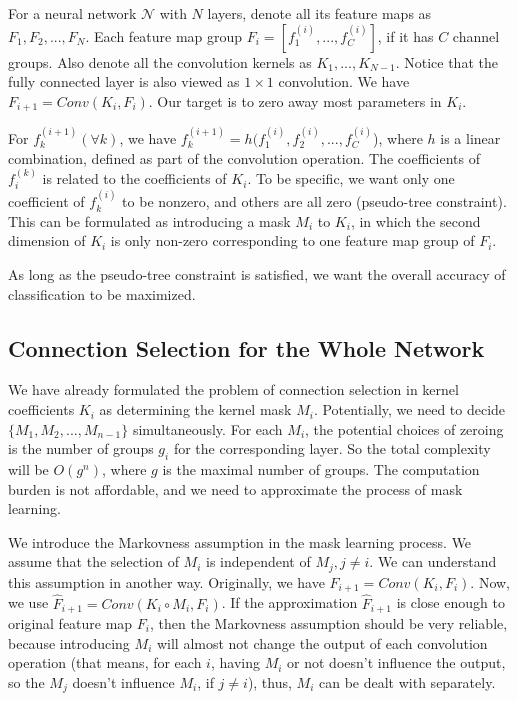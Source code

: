 \documentclass{acmtog} %
\begin{document}
For a neural network $\mathcal{N}$ with $N$ layers, denote all its feature maps as $F_1, F_2, ..., F_N$. Each feature map group $F_i = [f_1^{(i)}, ..., f_C^{(i)}]$, if it has $C$ channel groups. Also denote all the convolution kernels as $K_1, ..., K_{N-1}$. Notice that the fully connected layer is also viewed as $1\times1$ convolution.  We have $F_{i+1} = Conv(K_i, F_i)$. Our target is to zero away most parameters in $K_i$.

For $f_k^{(i+1)}(\forall k)$, we have $f_k^{(i+1)} = h(f_1^{(i)}, f_2^{(i)}, ..., f_C^{(i)}$), where $h$ is a linear combination, defined as part of the convolution operation. The coefficients of $f_i^{(k)}$ is related to the coefficients of $K_i$. To be specific, we want only one coefficient of $f_k^{(i)}$ to be nonzero, and others are all zero (pseudo-tree constraint). This can be formulated as introducing a mask $M_i$ to $K_i$, in which the second dimension of $K_i$ is only non-zero corresponding to one feature map group of $F_i$.

As long as the pseudo-tree constraint is satisfied, we want the overall accuracy of classification to be maximized.
\subsection{Connection Selection for the Whole Network}
We have already formulated the problem of connection selection in kernel coefficients $K_i$ as determining the kernel mask $M_i$. Potentially, we need to decide $\{M_1, M_2, ..., M_{n-1}\}$ simultaneously. For each $M_i$, the potential choices of zeroing is the number of groups $g_i$ for the corresponding layer. So the total complexity will be $O(g^n)$, where $g$ is the maximal number of groups. The computation burden is not affordable, and we need to approximate the process of mask learning. 

We introduce the Markovness assumption in the mask learning process. We assume that the selection of $M_i$ is independent of $M_j, j\neq i$. We can understand this assumption in another way. Originally, we have $F_{i+1} = Conv(K_i, F_i)$. Now, we use $\hat{F}_{i+1} = Conv(K_i\circ M_i, F_i)$. If the approximation $\hat{F}_{i+1}$ is close enough to original feature map $F_i$, then the Markovness assumption should be very reliable, because introducing $M_i$ will almost not change the output of each convolution operation (that means, for each $i$, having $M_i$ or not doesn't influence the output, so the $M_j$ doesn't influence $M_i$, if $j\neq i$), thus, $M_i$ can be dealt with separately. 
\end{document}
